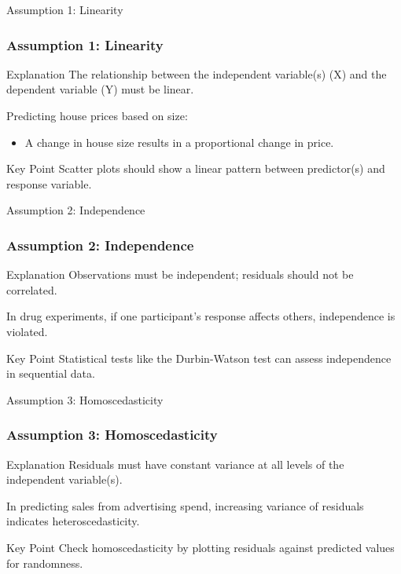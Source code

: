 \documentclass[aspectratio=169]{beamer}
\begin{document}
\begin{frame}[fragile]{Assumption 1: Linearity}
    \frametitle{Assumption 1: Linearity}
    \begin{block}{Explanation}
        The relationship between the independent variable(s) (X) and the dependent variable (Y) must be linear.
    \end{block}
    \begin{example}
        Predicting house prices based on size:
        \begin{itemize}
            \item A change in house size results in a proportional change in price.
        \end{itemize}
    \end{example}
    \begin{block}{Key Point}
        Scatter plots should show a linear pattern between predictor(s) and response variable.
    \end{block}
\end{frame}

\begin{frame}[fragile]{Assumption 2: Independence}
    \frametitle{Assumption 2: Independence}
    \begin{block}{Explanation}
        Observations must be independent; residuals should not be correlated.
    \end{block}
    \begin{example}
        In drug experiments, if one participant's response affects others, independence is violated.
    \end{example}
    \begin{block}{Key Point}
        Statistical tests like the Durbin-Watson test can assess independence in sequential data.
    \end{block}
\end{frame}

\begin{frame}[fragile]{Assumption 3: Homoscedasticity}
    \frametitle{Assumption 3: Homoscedasticity}
    \begin{block}{Explanation}
        Residuals must have constant variance at all levels of the independent variable(s).
    \end{block}
    \begin{example}
        In predicting sales from advertising spend, increasing variance of residuals indicates heteroscedasticity.
    \end{example}
    \begin{block}{Key Point}
        Check homoscedasticity by plotting residuals against predicted values for randomness.
    \end{block}
\end{frame}
\end{document}
